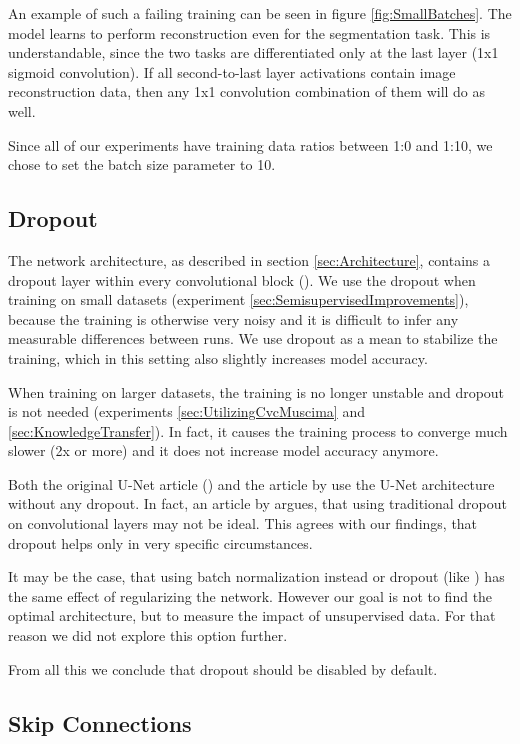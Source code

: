 An example of such a failing training can be seen in figure \ref{fig:SmallBatches}. The model learns to perform reconstruction even for the segmentation task. This is understandable, since the two tasks are differentiated only at the last layer (1x1 sigmoid convolution). If all second-to-last layer activations contain image reconstruction data, then any 1x1 convolution combination of them will do as well.

Since all of our experiments have training data ratios between 1:0 and 1:10, we chose to set the batch size parameter to 10.


\subsection{Dropout}
\label{sec:Dropout}

The network architecture, as described in section \ref{sec:Architecture}, contains a dropout layer within every convolutional block (\cite{Dropout}). We use the dropout when training on small datasets (experiment \ref{sec:SemisupervisedImprovements}), because the training is otherwise very noisy and it is difficult to infer any measurable differences between runs. We use dropout as a mean to stabilize the training, which in this setting also slightly increases model accuracy.

When training on larger datasets, the training is no longer unstable and dropout is not needed (experiments \ref{sec:UtilizingCvcMuscima} and \ref{sec:KnowledgeTransfer}). In fact, it causes the training process to converge much slower (2x or more) and it does not increase model accuracy anymore.

Both the original U-Net article (\cite{UNet}) and the article by \cite{HajicEtAl} use the U-Net architecture without any dropout. In fact, an article by \cite{DropoutOnConvolutions} argues, that using traditional dropout on convolutional layers may not be ideal. This agrees with our findings, that dropout helps only in very specific circumstances.

It may be the case, that using batch normalization instead or dropout (like \cite{HajicEtAl}) has the same effect of regularizing the network. However our goal is not to find the optimal architecture, but to measure the impact of unsupervised data. For that reason we did not explore this option further.

From all this we conclude that dropout should be disabled by default.


\subsection{Skip Connections}
\label{sec:SkipConnections}

